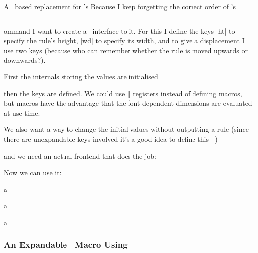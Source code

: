\begin{example}{A \kv\ based replacement for \LaTeXe's }
  Because I keep forgetting the correct order of \LaTeXe's |\rule| command I
  want to create a \kv\ interface to it. For this I define the keys |ht| to
  specify the rule's height, |wd| to specify its width, and to give a
  displacement I use two keys (because who can remember whether the rule is
  moved upwards or downwards?).

  First the internals storing the values are initialised
  \begin{enverb}
    \makeatletter
    \newcommand*\myrule@ht{1ex}
    \newcommand*\myrule@wd{0.1em}
    \newcommand*\myrule@raise{\z@}
  \end{enverb}
  then the keys are defined. We could use |\dimen| registers instead of defining
  macros, but macros have the advantage that the font dependent dimensions are
  evaluated at use time.
  \begin{enverb}
    \protected{}
    \protected{}
    \protected{}
    \protected{}
  \end{enverb}
  We also want a way to change the initial values without outputting a rule
  (since there are unexpandable keys involved it's a good idea to define this
  |\protected|)
  \begin{enverb}
    \protected\ekvsetdef{}
  \end{enverb}
  and we need an actual frontend that does the job:
  \begin{enverb}
    \newcommand*\myrule[1][]
      {%
        \begingroup
          \myruleset{#1}%
          \rule[\myrule@raise]{\myrule@wd}{\myrule@ht}%
        \endgroup
      }
    \makeatother
  \end{enverb}
  Now we can use it:
  \begin{enverb}[same-line=0.5,restore]
    a\myrule\par
    a\myrule[ht=2ex,lower=.5ex]\par
    a\myrule
  \end{enverb}
\end{example}


\subsubsection{An Expandable \kv\ Macro Using
  \label{sec:expkv:sneak}}

